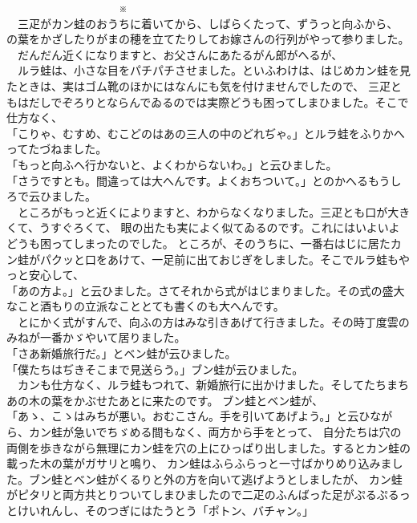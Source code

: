 \documentclass[
a4paper,
book]
{tarticle}
\begin{document}
　　　　　　　　　　※\\

　三疋がカン蛙のおうちに着いてから、しばらくたって、ずうっと向ふから、\\
の葉をかざしたりがまの穂を立てたりしてお嫁さんの行列がやって参りました。\\
　だんだん近くになりますと、お父さんにあたるがん郎がへるが、\\
　ルラ蛙は、小さな目をパチパチさせました。といふわけは、はじめカン蛙を見たときは、実はゴム靴のほかにはなんにも気を付けませんでしたので、
三疋ともはだしでぞろりとならんでゐるのでは実際どうも困ってしまひました。そこで仕方なく、\\
「こりゃ、むすめ、むこどのはあの三人の中のどれぢゃ。」とルラ蛙をふりかへってたづねました。\\
「もっと向ふへ行かないと、よくわからないわ。」と云ひました。\\
「さうですとも。間違っては大へんです。よくおちついて。」とのかへるもうしろで云ひました。\\
　ところがもっと近くによりますと、わからなくなりました。三疋とも口が大きくて、うすぐろくて、
眼の出たも実によく似てゐるのです。これにはいよいよどうも困ってしまったのでした。
ところが、そのうちに、一番右はじに居たカン蛙がパクッと口をあけて、一足前に出ておじぎをしました。そこでルラ蛙もやっと安心して、\\
「あの方よ。」と云ひました。さてそれから式がはじまりました。その式の盛大なこと酒もりの立派なこととても書くのも大へんです。\\
　とにかく式がすんで、向ふの方はみな引きあげて行きました。その時丁度雲のみねが一番かゞやいて居りました。\\
「さあ新婚旅行だ。」とベン蛙が云ひました。\\
「僕たちはぢきそこまで見送らう。」ブン蛙が云ひました。\\
　カンも仕方なく、ルラ蛙もつれて、新婚旅行に出かけました。そしてたちまちあの木の葉をかぶせたあとに来たのです。
ブン蛙とベン蛙が、\\
「あゝ、こゝはみちが悪い。おむこさん。手を引いてあげよう。」と云ひながら、カン蛙が急いでちゞめる間もなく、両方から手をとって、
自分たちは穴の両側を歩きながら無理にカン蛙を穴の上にひっぱり出しました。するとカン蛙の載った木の葉がガサリと鳴り、
カン蛙はふらふらっと一寸ばかりめり込みました。ブン蛙とベン蛙がくるりと外の方を向いて逃げようとしましたが、
カン蛙がピタリと両方共とりついてしまひましたので二疋のふんばった足がぷるぷるっとけいれんし、そのつぎにはたうとう「ポトン、バチャン。」\\
\end{document}
